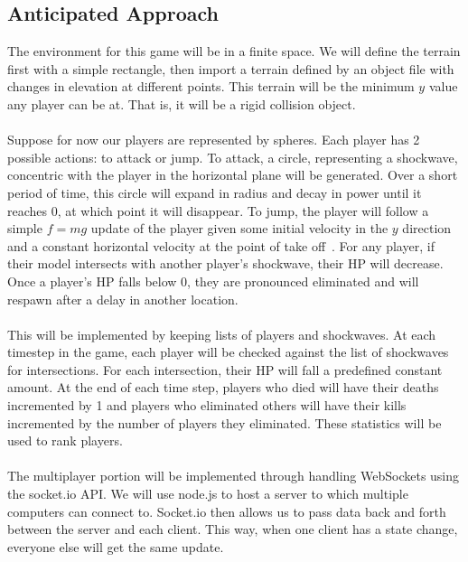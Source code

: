 \documentclass{acmsiggraph}
\begin{document}
    \subsection{Anticipated Approach}
    The environment for this game will be in a finite space. We will define the terrain first with a simple rectangle, then import a terrain defined by an object file with changes in elevation at different points. This terrain will be the minimum $y$ value any player can be at. That is, it will be a rigid collision object.
    \\\\
    Suppose for now our players are represented by spheres. Each player has 2 possible actions: to attack or jump. To attack, a circle, representing a shockwave, concentric with the player in the horizontal plane will be generated. Over a short period of time, this circle will expand in radius and decay in power until it reaches 0, at which point it will disappear. To jump, the player will follow a simple $f = mg$ update of the player given some initial velocity in the $y$ direction and a constant horizontal velocity at the point of take off~\cite{K04}. For any player, if their model intersects with another player's shockwave, their HP will decrease. Once a player's HP falls below 0, they are pronounced eliminated and will respawn after a delay in another location.
    \\\\
    This will be implemented by keeping lists of players and shockwaves. At each timestep in the game, each player will be checked against the list of shockwaves for intersections. For each intersection, their HP will fall a predefined constant amount. At the end of each time step, players who died will have their deaths incremented by 1 and players who eliminated others will have their kills incremented by the number of players they eliminated. These statistics will be used to rank players.
    \\\\
    The multiplayer portion will be implemented through handling WebSockets using the socket.io API. We will use node.js to host a server to which multiple computers can connect to. Socket.io then allows us to pass data back and forth between the server and each client. This way, when one client has a state change, everyone else will get the same update.
\end{document}

